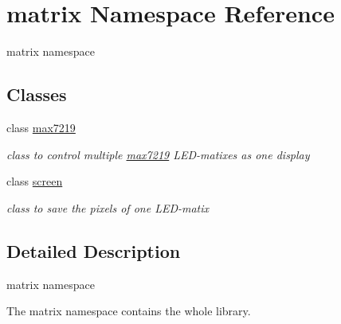 \hypertarget{namespacematrix}{}\section{matrix Namespace Reference}
\label{namespacematrix}


matrix namespace  


\subsection*{Classes}
\begin{DoxyCompactItemize}
\item 
class \mbox{\hyperlink{classmatrix_1_1max7219}{max7219}}
\begin{DoxyCompactList}\small\item\em class to control multiple \mbox{\hyperlink{classmatrix_1_1max7219}{max7219}} L\+E\+D-\/matixes as one display \end{DoxyCompactList}\item 
class \mbox{\hyperlink{classmatrix_1_1screen}{screen}}
\begin{DoxyCompactList}\small\item\em class to save the pixels of one L\+E\+D-\/matix \end{DoxyCompactList}\end{DoxyCompactItemize}


\subsection{Detailed Description}
matrix namespace 

The matrix namespace contains the whole library. 